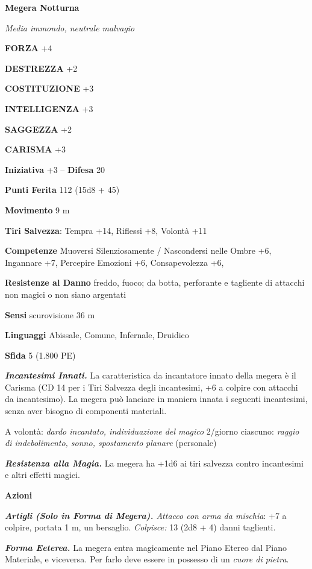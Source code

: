\begin{multicols}{2}
\medskip{}\textbf{Megera Notturna}

\emph{Media immondo, neutrale malvagio}

\textbf{FORZA} +4

\textbf{DESTREZZA} +2

\textbf{COSTITUZIONE} +3

\textbf{INTELLIGENZA} +3

\textbf{SAGGEZZA} +2

\textbf{CARISMA} +3

\textbf{Iniziativa} +3 -- \textbf{Difesa} 20

\textbf{Punti Ferita} 112 (15d8 + 45)

\textbf{Movimento} 9 m

\textbf{Tiri Salvezza}: Tempra +14, Riflessi +8, Volontà +11

\textbf{Competenze} Muoversi Silenziosamente / Nascondersi nelle Ombre +6, Ingannare +7, Percepire Emozioni +6, Consapevolezza +6,

\textbf{Resistenze al Danno} freddo, fuoco; da botta, perforante e tagliente di attacchi non magici o non siano argentati

\textbf{Sensi} scurovisione 36 m

\textbf{Linguaggi} Abissale, Comune, Infernale, Druidico

\textbf{Sfida} 5 (1.800 PE)

\emph{\textbf{Incantesimi Innati.}} La caratteristica da incantatore innato della megera è il Carisma (CD 14 per i Tiri Salvezza degli incantesimi, +6 a colpire con attacchi da incantesimo). La megera può lanciare in maniera innata i seguenti incantesimi, senza aver bisogno di
componenti materiali.

A volontà: \emph{dardo incantato, individuazione del magico} 2/giorno ciascuno: \emph{raggio di indebolimento, sonno, spostamento} \emph{planare} (personale)

\emph{\textbf{Resistenza alla Magia.}} La megera ha +1d6 ai tiri salvezza contro incantesimi e altri effetti magici.

\textbf{Azioni}

\emph{\textbf{Artigli (Solo in Forma di Megera).} Attacco con arma da 	mischia}: +7 a colpire, portata 1 m, un bersaglio. \emph{Colpisce:} 13 (2d8 + 4) danni taglienti.

\emph{\textbf{Forma Eeterea.}} La megera entra magicamente nel Piano Etereo dal Piano Materiale, e viceversa. Per farlo deve essere in possesso di un \emph{cuore di pietra}.


\end{multicols}
